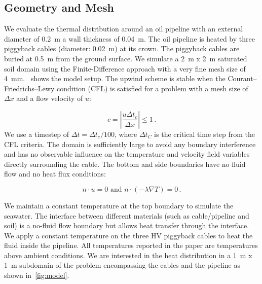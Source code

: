 \documentclass[Journal,letterpaper,InsideFigs]{ascelike-new}
\begin{document}
\subsection*{Geometry and Mesh}

We evaluate the thermal distribution around an oil pipeline with an external diameter of \SI{0.2}{\meter} a wall thickness of \SI{0.04}{\meter}. The oil pipeline is heated by three piggyback cables (diameter: \SI{0.02}{\meter}) at its crown. The piggyback cables are buried at \SI{0.5}{\meter} from the ground surface. We simulate a \SI{2}{\meter} x \SI{2}{\meter} saturated soil domain using the Finite-Difference approach with a very fine mesh size of \SI{4}{\milli\meter}.~ shows the model setup. The upwind scheme is stable when the Courant–Friedrichs–Lewy condition (CFL) is satisfied for a problem with a mesh size of $\Delta x$ and a flow velocity of $u$:

\begin{equation}
c = |\frac{u \Delta t_c}{\Delta x}| \le 1\,.
\end{equation}
\noindent We use a timestep of $\Delta t = \Delta t_c / 100$, where $\Delta t_C$ is the critical time step from the CFL criteria. The domain is sufficiently large to avoid any boundary interference and has no observable influence on the temperature and velocity field variables directly surrounding the cable. The bottom and side boundaries have no fluid flow and no heat flux conditions:

\begin{equation}
n \cdot u = 0 \text{ and } n \cdot (-\lambda \nabla T) = 0\,.
\end{equation}

We maintain a constant temperature at the top boundary to simulate the seawater. The interface between different materials (such as cable/pipeline and soil) is a no-fluid flow boundary but allows heat transfer through the interface. We apply a constant temperature on the three HV piggyback cables to heat the fluid inside the pipeline. All temperatures reported in the paper are temperatures above ambient conditions. We are interested in the heat distribution in a \SI{1}{\meter} x \SI{1}{\meter} subdomain of the problem encompassing the cables and the pipeline as shown in~\cref{fig:model}.
\end{document}
